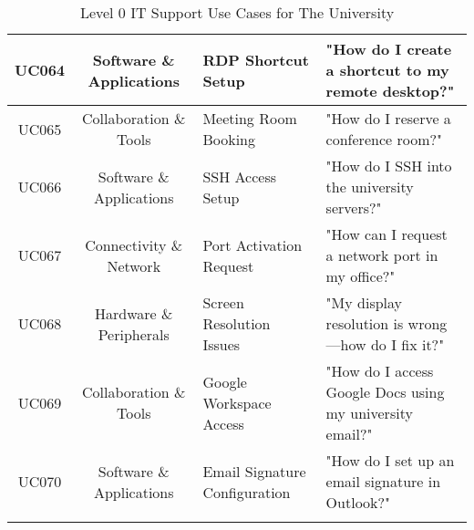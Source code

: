 \documentclass{article.cls}
\begin{document}
\begin{longtable}{|c|c|p{3.5cm}|p{6.5cm}|}
        \hline
        UC064 & Software \& Applications & RDP Shortcut Setup & "How do I create a shortcut to my remote desktop?" \\
        \hline
        UC065 & Collaboration \& Tools & Meeting Room Booking & "How do I reserve a conference room?" \\
        \hline
        UC066 & Software \& Applications & SSH Access Setup & "How do I SSH into the university servers?" \\
        \hline
        UC067 & Connectivity \& Network & Port Activation Request & "How can I request a network port in my office?" \\
        \hline
        UC068 & Hardware \& Peripherals & Screen Resolution Issues & "My display resolution is wrong—how do I fix it?" \\
        \hline
        UC069 & Collaboration \& Tools & Google Workspace Access & "How do I access Google Docs using my university email?" \\
        \hline
        UC070 & Software \& Applications & Email Signature Configuration & "How do I set up an email signature in Outlook?" \\
        \hline
        \caption{Level 0 IT Support Use Cases for The University}
    \end{longtable}
\end{document}
